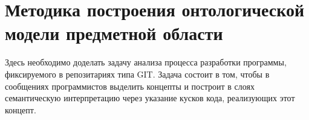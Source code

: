 \documentclass[12pt,a4paper]{extarticle}
\begin{document}
\section{Методика построения онтологической модели предметной области}
\label{sec:technique-onto}

Здесь необходимо доделать задачу анализа процесса разработки программы,
фиксируемого в репозитариях типа GIT.  Задача состоит в том, чтобы в сообщениях
программистов выделить концепты и построит в слоях семантическую интерпретацию
через указание кусков кода, реализующих этот концепт.
\end{document}

